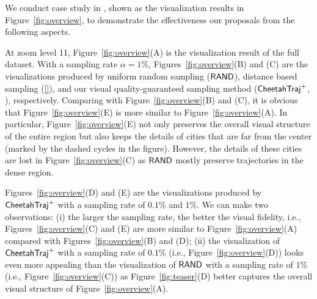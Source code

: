 We conduct case study in \pt{}, shown as the visualization results in Figure~\ref{fig:overview}, to demonstrate the effectiveness our proposals from the following aspects.


At zoom level 11, Figure~\ref{fig:overview}(A) is the visualization result of the full \pt{} dataset.
With a sampling rate $\alpha \!=\! 1\%$, Figures~\ref{fig:overview}(B) and (C) are the visualizations produced by uniform random sampling ($\mathsf{RAND}$), distance based sampling (\ref{}),   
and our visual quality-guaranteed sampling method ($\mathsf{CheetahTraj}^{+}$, ), respectively. Comparing with Figure~\ref{fig:overview}(B) and (C), it is obvious that Figure~\ref{fig:overview}(E) is more similar to Figure~\ref{fig:overview}(A). In particular, Figure~\ref{fig:overview}(E) not only preserves the overall visual structure of the entire region but also keeps the details of cities that are far from the center (marked by the dashed cycles in the figure). However, the details of these cities are lost in Figure~\ref{fig:overview}(C) as $\mathsf{RAND}{}$ mostly preserve trajectories in the dense region.  

Figures~\ref{fig:overview}(D) and (E) are the visualizations produced by $\mathsf{CheetahTraj}^{+}{}$ with a sampling rate of $0.1\%$ and $1\%$. We can make two observations: (i) the larger the sampling rate, the better the visual fidelity, i.e., Figures~\ref{fig:overview}(C) and (E) are more similar to Figure~\ref{fig:overview}(A) compared with Figures~\ref{fig:overview}(B) and (D); (ii) the visualization of $\mathsf{CheetahTraj}^{+}$ with a sampling rate of $0.1\%$ (i.e., Figure~\ref{fig:overview}(D)) looks even more appealing than the visualization of $\mathsf{RAND}{}$ with a sampling rate of $1\%$ (i.e., Figure~\ref{fig:overview}(C)) as Figure~\ref{fig:teaser}(D) better captures the overall visual structure of Figure~\ref{fig:overview}(A).


